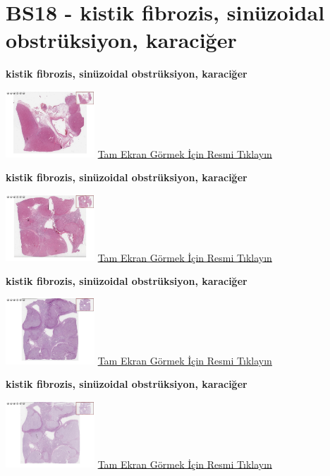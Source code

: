 \documentclass[
  letterpaper,
  DIV=11,
  numbers=noendperiod]{scrreprt}
\begin{document}
\hypertarget{sec-BS18}{%
\section{BS18 - kistik fibrozis, sinüzoidal obstrüksiyon,
karaciğer}\label{sec-BS18}}

\textbf{kistik fibrozis, sinüzoidal obstrüksiyon, karaciğer}

\href{https://images.patolojiatlasi.com/BS18/HE1.html}{\includegraphics[width=0.25\textwidth,height=\textheight]{./screenshots/thumbnail_BS18-HE1.png}}
\href{https://images.patolojiatlasi.com/BS18/HE1.html}{Tam Ekran Görmek
İçin Resmi Tıklayın}

\textbf{kistik fibrozis, sinüzoidal obstrüksiyon, karaciğer}

\href{https://images.patolojiatlasi.com/BS18/HE2.html}{\includegraphics[width=0.25\textwidth,height=\textheight]{./screenshots/thumbnail_BS18-HE2.png}}
\href{https://images.patolojiatlasi.com/BS18/HE2.html}{Tam Ekran Görmek
İçin Resmi Tıklayın}

\textbf{kistik fibrozis, sinüzoidal obstrüksiyon, karaciğer}

\href{https://images.patolojiatlasi.com/BS18/PAS.html}{\includegraphics[width=0.25\textwidth,height=\textheight]{./screenshots/thumbnail_BS18-PAS.png}}
\href{https://images.patolojiatlasi.com/BS18/PAS.html}{Tam Ekran Görmek
İçin Resmi Tıklayın}

\textbf{kistik fibrozis, sinüzoidal obstrüksiyon, karaciğer}

\href{https://images.patolojiatlasi.com/BS18/PASD.html}{\includegraphics[width=0.25\textwidth,height=\textheight]{./screenshots/thumbnail_BS18-PASD.png}}
\href{https://images.patolojiatlasi.com/BS18/PASD.html}{Tam Ekran Görmek
İçin Resmi Tıklayın}
\end{document}
